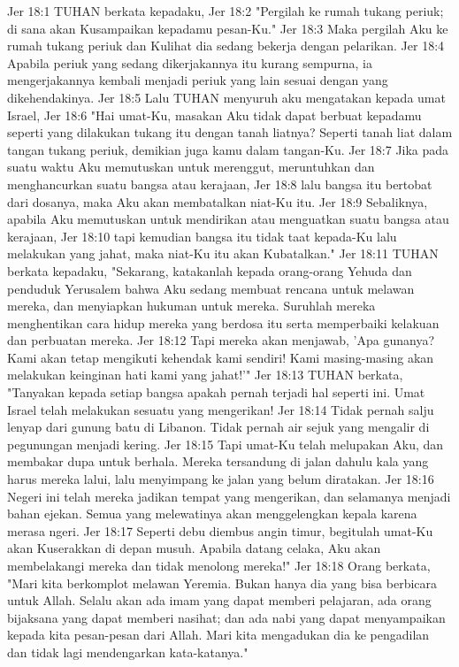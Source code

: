 Jer 18:1  TUHAN berkata kepadaku,
Jer 18:2  "Pergilah ke rumah tukang periuk; di sana akan Kusampaikan kepadamu pesan-Ku."
Jer 18:3  Maka pergilah Aku ke rumah tukang periuk dan Kulihat dia sedang bekerja dengan pelarikan.
Jer 18:4  Apabila periuk yang sedang dikerjakannya itu kurang sempurna, ia mengerjakannya kembali menjadi periuk yang lain sesuai dengan yang dikehendakinya.
Jer 18:5  Lalu TUHAN menyuruh aku mengatakan kepada umat Israel,
Jer 18:6  "Hai umat-Ku, masakan Aku tidak dapat berbuat kepadamu seperti yang dilakukan tukang itu dengan tanah liatnya? Seperti tanah liat dalam tangan tukang periuk, demikian juga kamu dalam tangan-Ku.
Jer 18:7  Jika pada suatu waktu Aku memutuskan untuk merenggut, meruntuhkan dan menghancurkan suatu bangsa atau kerajaan,
Jer 18:8  lalu bangsa itu bertobat dari dosanya, maka Aku akan membatalkan niat-Ku itu.
Jer 18:9  Sebaliknya, apabila Aku memutuskan untuk mendirikan atau menguatkan suatu bangsa atau kerajaan,
Jer 18:10  tapi kemudian bangsa itu tidak taat kepada-Ku lalu melakukan yang jahat, maka niat-Ku itu akan Kubatalkan."
Jer 18:11  TUHAN berkata kepadaku, "Sekarang, katakanlah kepada orang-orang Yehuda dan penduduk Yerusalem bahwa Aku sedang membuat rencana untuk melawan mereka, dan menyiapkan hukuman untuk mereka. Suruhlah mereka menghentikan cara hidup mereka yang berdosa itu serta memperbaiki kelakuan dan perbuatan mereka.
Jer 18:12  Tapi mereka akan menjawab, 'Apa gunanya? Kami akan tetap mengikuti kehendak kami sendiri! Kami masing-masing akan melakukan keinginan hati kami yang jahat!'"
Jer 18:13  TUHAN berkata, "Tanyakan kepada setiap bangsa apakah pernah terjadi hal seperti ini. Umat Israel telah melakukan sesuatu yang mengerikan!
Jer 18:14  Tidak pernah salju lenyap dari gunung batu di Libanon. Tidak pernah air sejuk yang mengalir di pegunungan menjadi kering.
Jer 18:15  Tapi umat-Ku telah melupakan Aku, dan membakar dupa untuk berhala. Mereka tersandung di jalan dahulu kala yang harus mereka lalui, lalu menyimpang ke jalan yang belum diratakan.
Jer 18:16  Negeri ini telah mereka jadikan tempat yang mengerikan, dan selamanya menjadi bahan ejekan. Semua yang melewatinya akan menggelengkan kepala karena merasa ngeri.
Jer 18:17  Seperti debu diembus angin timur, begitulah umat-Ku akan Kuserakkan di depan musuh. Apabila datang celaka, Aku akan membelakangi mereka dan tidak menolong mereka!"
Jer 18:18  Orang berkata, "Mari kita berkomplot melawan Yeremia. Bukan hanya dia yang bisa berbicara untuk Allah. Selalu akan ada imam yang dapat memberi pelajaran, ada orang bijaksana yang dapat memberi nasihat; dan ada nabi yang dapat menyampaikan kepada kita pesan-pesan dari Allah. Mari kita mengadukan dia ke pengadilan dan tidak lagi mendengarkan kata-katanya."
